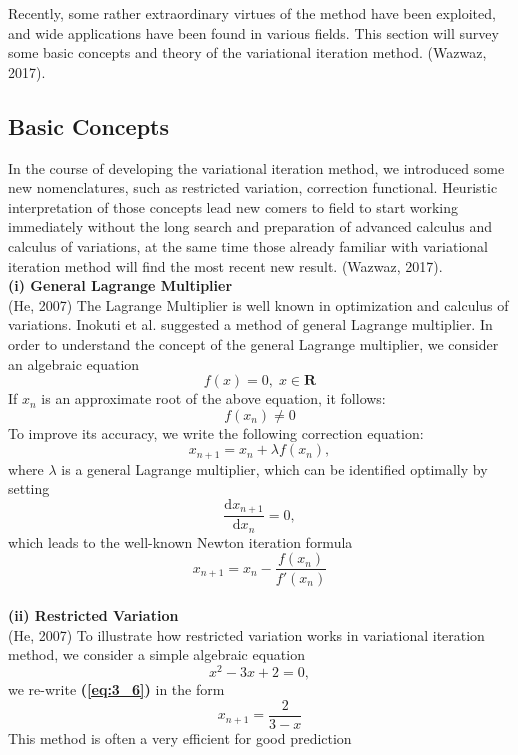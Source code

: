 \documentclass[12pt]{report}
\newcommand{\NI}{\noindent}
\newcommand{\bt}[1]{\textbf{#1}}
\newcommand{\refn}[1]{\bt{(\ref{#1})}}
\begin{document}
Recently, some rather extraordinary virtues of the method have been exploited, and wide applications have been found in various fields. This section will survey some basic concepts and theory of the variational iteration method. (Wazwaz, 2017).

\subsection{Basic Concepts}
In the course of developing the variational iteration method, we introduced some new nomenclatures, such as restricted variation, correction functional. Heuristic interpretation of those concepts lead new comers to field to start working immediately without the long search and preparation of advanced calculus and calculus of variations, at the same time those already familiar with variational iteration method will find the most recent new result. (Wazwaz, 2017).\\

\NI\textbf{(i) General Lagrange Multiplier}\\
(He, 2007) The Lagrange Multiplier is well known in optimization and calculus of variations. Inokuti et al. suggested a method of general Lagrange  multiplier. In order to understand the concept of the general Lagrange multiplier, we consider an algebraic equation
\begin{equation}
	f(x) = 0, \; x \in \mathbf{R}
\end{equation}
If $x_n$ is an approximate root of the above equation, it follows: 
\begin{equation}
	f(x_n) \neq 0
\end{equation}
To improve its accuracy, we write the following correction equation:
\begin{equation}
	x_{n+1} = x_n + \lambda f(x_n),
\end{equation}
where $\lambda$ is a general Lagrange multiplier, which can be identified optimally by setting 
\begin{equation}
	\frac{\text{d}x_{n+1}}{\text{d}x_n}=0,
\end{equation}
which leads to the well-known Newton iteration formula
\begin{equation}
	x_{n+1} = x_n - \frac{f(x_n)}{f'(x_n)}
\end{equation}
\\
\NI\textbf{(ii) Restricted Variation}\\
(He, 2007) To illustrate how restricted variation works in variational iteration method, we consider a simple algebraic equation
\begin{equation}
		x^2 - 3x + 2 = 0, \label{eq:3_6}
\end{equation}
we re-write \refn{eq:3_6} in the form
\begin{equation}
	x_{n+1} = \frac{2}{3-x}
\end{equation}
This method is often a very efficient for good prediction\\
\end{document}
